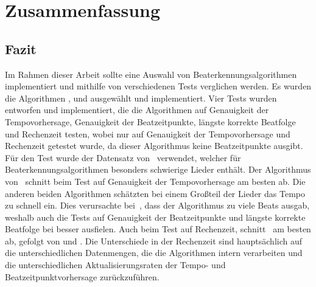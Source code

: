 \chapter{Zusammenfassung}
\label{zusammenfassung}
\acresetall

\section{Fazit}
{
	Im Rahmen dieser Arbeit sollte eine Auswahl von Beaterkennungsalgorithmen implementiert
		und mithilfe von verschiedenen Tests verglichen werden.
	Es wurden die Algorithmen \cite{2001_BeatThis}, \cite{2009_DaPlSt} und \cite{2011_PlRoSt} ausgewählt und implementiert.
	Vier Tests wurden entworfen und implementiert,
		die die Algorithmen auf Genauigkeit der Tempovorhersage, Genauigkeit der Beatzeitpunkte, längste korrekte Beatfolge und Rechenzeit testen,
		wobei \cite{2001_BeatThis} nur auf Genauigkeit der Tempovorhersage und Rechenzeit getestet wurde,
		da dieser Algorithmus keine Beatzeitpunkte ausgibt.
	Für den Test wurde der Datensatz von~\cite{2012_HoDaZaOlGo} verwendet,
		welcher für Beaterkennungsalgorithmen besonders schwierige Lieder enthält.
	Der Algorithmus von~\cite{2009_DaPlSt} schnitt beim Test auf Genauigkeit der Tempovorhersage am besten ab.
	Die anderen beiden Algorithmen schätzten bei einem Gro{\ss}teil der Lieder das Tempo zu schnell ein.
	Dies verursachte bei~\cite{2011_PlRoSt},
		dass der Algorithmus zu viele Beats ausgab,
		weshalb auch die Tests auf Genauigkeit der Beatzeitpunkte und längste korrekte Beatfolge bei \cite{2009_DaPlSt} besser ausfielen.
	Auch beim Test auf Rechenzeit,
		schnitt~\cite{2009_DaPlSt} am besten ab,
		gefolgt von \cite{2001_BeatThis} und \cite{2011_PlRoSt}.
	Die Unterschiede in der Rechenzeit sind hauptsächlich auf die unterschiedlichen Datenmengen,
		die die Algorithmen intern verarbeiten
		und die unterschiedlichen Aktualisierungsraten der Tempo- und Beatzeitpunktvorhersage zurückzuführen.
}

